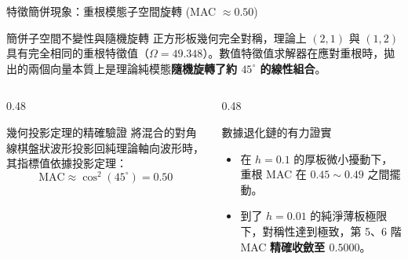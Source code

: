 \begin{frame}{特徵簡併現象：重根模態子空間旋轉 (MAC $\approx 0.50$)}
    \begin{block}{簡併子空間不變性與隨機旋轉}
        正方形板幾何完全對稱，理論上 $(2,1)$ 與 $(1,2)$ 具有完全相同的重根特徵值（$\Omega=49.348$）。數值特徵值求解器在應對重根時，拋出的兩個向量本質上是理論純模態\textbf{隨機旋轉了約 $45^\circ$ 的線性組合}。
    \end{block}
    \vfill
    \begin{columns}
        \begin{column}{0.48\textwidth}
            \begin{block}{幾何投影定理的精確驗證}
                將混合的對角線棋盤狀波形投影回純理論軸向波形時，其指標值依據投影定理：
                $$\text{MAC} \approx \cos^2(45^\circ) = 0.50$$
            \end{block}
        \end{column}
        \begin{column}{0.48\textwidth}
            \begin{block}{數據退化鏈的有力證實}
                \begin{itemize}
                    \item 在 $h=0.1$ 的厚板微小擾動下，重根 MAC 在 $0.45 \sim 0.49$ 之間擺動。
                    \item 到了 $h=0.01$ 的純淨薄板極限下，對稱性達到極致，第 5、6 階 MAC \textbf{精確收斂至 $0.5000$}。
                \end{itemize}
            \end{block}
        \end{column}
    \end{columns}
\end{frame}